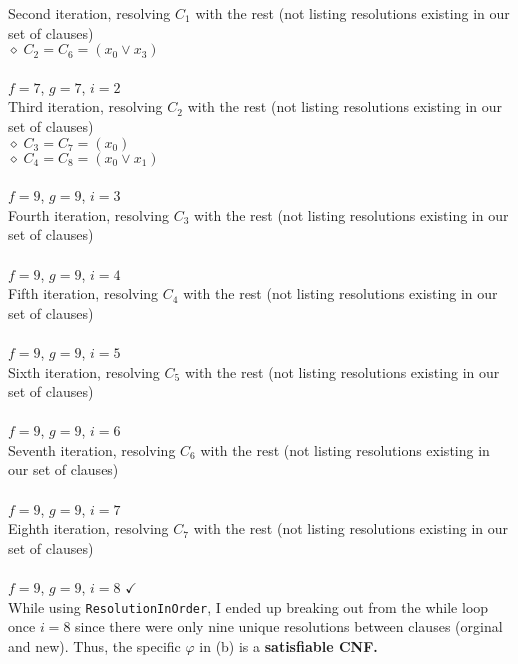 \documentclass[11pt]{article}
\begin{document}
\begin{enumerate}
\begin{enumerate}
      Second iteration, resolving $C_1$ with the rest (not listing resolutions existing in our set of clauses) \\
      $\diamond \; C_2 = C_6 = (x_0 \vee x_3) $ \\
      \\
      $f=7$, $g = 7$, $i=2$ \\

      Third iteration, resolving $C_2$ with the rest (not listing resolutions existing in our set of clauses) \\
      $\diamond \; C_3 = C_7 = (x_0)$ \\
      $\diamond \; C_4 = C_8 = (x_0 \vee x_1)$ \\
      \\
      $f=9$, $g = 9$, $i=3$ \\

      Fourth iteration, resolving $C_3$ with the rest (not listing resolutions existing in our set of clauses) \\
      \\
      $f=9$, $g = 9$, $i=4$ \\

      Fifth iteration, resolving $C_4$ with the rest (not listing resolutions existing in our set of clauses) \\
      \\
      $f=9$, $g = 9$, $i=5$ \\
      
      Sixth iteration, resolving $C_5$ with the rest (not listing resolutions existing in our set of clauses) \\
      \\
      $f=9$, $g = 9$, $i=6$ \\

      Seventh iteration, resolving $C_6$ with the rest (not listing resolutions existing in our set of clauses) \\
      \\
      $f=9$, $g = 9$, $i=7$ \\

      Eighth iteration, resolving $C_7$ with the rest (not listing resolutions existing in our set of clauses) \\
      \\
      $f=9$, $g = 9$, $i=8$   $\checkmark$ \\

      While using \texttt{ResolutionInOrder}, I ended up breaking out from the while loop once $i=8$ since there were only nine unique resolutions between clauses (orginal and new). Thus, the specific $\varphi$ in (b) is a \textbf{satisfiable CNF.} \\


\end{enumerate}
\end{enumerate}
\end{document}
